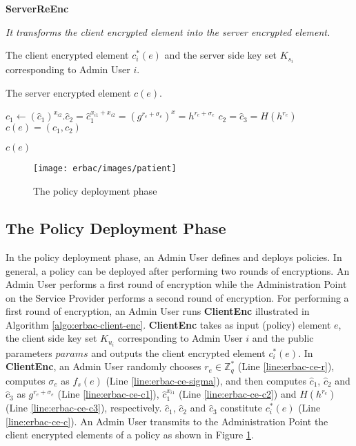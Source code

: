 \documentclass[epsfig,a4paper,11pt,titlepage]{book}
\numberwithin{algorithm}{chapter}
\newcommand{\algofontsize}{\fontsize{11}{12}\selectfont}
\begin{document}
\begin{algorithm} [htp]
{\algofontsize
\caption{\textbf{ServerReEnc}}

\label{algo:erbac-server-re-enc}

\begin{algorithmic}[1]

\INPUT \emph{It transforms the client encrypted element into the server encrypted element.}

\Require The client encrypted element $c^*_i (e)$ and the server side key set $K_{s_i}$ corresponding to Admin User $i$.

\Ensure The server encrypted element $c(e)$.

\medskip

\State $c_1 \leftarrow (\hat{c}_1)^{x_{i2}}.\hat{c}_2 = \hat{c}_1^{x_{i1}+x_{i2}} = (g^{r_e+{\sigma}_e})^x = h^{r_e+{\sigma}_e}$ \label{line:erbac-se-c1}
\State $c_2 = \hat{c}_3 = H(h^{r_e})$ \label{line:erbac-se-c2}
\State $c(e) = (c_1, c_2)$ \label{line:erbac-se-c}

\Return $c(e)$

\end{algorithmic}
}
\end{algorithm}




\begin{figure} [htp]
\centering
\texttt{[image: erbac/images/patient]} \caption{The policy deployment phase}
\label{fig:erbac-patient}
\end{figure}


\subsection{The Policy Deployment Phase}
\label{sec:espoon-policy-deployment-phase}
In the policy deployment phase, an Admin User defines and deploys policies. In general, a policy can be deployed after performing two rounds of encryptions. An Admin User performs a first round of encryption while the Administration Point on the Service Provider performs a second round of encryption. For performing a first round of encryption, an Admin User runs \textbf{ClientEnc} illustrated in Algorithm \ref{algo:erbac-client-enc}. \textbf{ClientEnc} takes as input (policy) element $e$, the client side key set $K_{u_i}$ corresponding to Admin User $i$ and the public parameters $params$ and outputs the client encrypted element $c^*_i (e)$. In \textbf{ClientEnc}, an Admin User randomly chooses $r_{e} \in \mathbb{Z}^*_q$ (Line \ref{line:erbac-ce-r}), computes ${\sigma}_e$ as $f_s (e)$ (Line \ref{line:erbac-ce-sigma}), and then computes $\hat{c}_1$, $\hat{c}_2$ and $\hat{c}_3$ as $g^{r_e+{\sigma}_e}$ (Line \ref{line:erbac-ce-c1}), $\hat{c}_1^{x_{i1}}$ (Line \ref{line:erbac-ce-c2}) and $H(h^{r_e})$ (Line \ref{line:erbac-ce-c3}), respectively. $\hat{c}_1$, $\hat{c}_2$ and $\hat{c}_3$ constitute $c^*_i (e)$ (Line \ref{line:erbac-ce-c}). An Admin User transmits to the Administration Point the client encrypted elements of a policy as shown in Figure \ref{fig:erbac-patient}.
\end{document}
